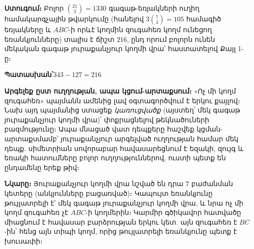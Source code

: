 \documentclass[11pt,a4paper]{article}
\newcommand{\answer}[1]{\begin{answerbox}\centering\textbf{Պատասխան՝}\quad #1\end{answerbox}}
\begin{document}
\textbf{Ստուգում։} Բոլոր $\binom{21}{3}=1330$ գագաթ-եռյակների ուղիղ համակարգչային թվարկումը
(հանելով $3\binom{7}{3}=105$ համագիծ եռյակները և $ABC$-ի որևէ կողմին զուգահեռ կողմ ունեցող
եռանկյունները) տալիս է ճիշտ $216$, ընդ որում բոլորն ունեն մեկական գագաթ յուրաքանչյուր կողմի վրա՝
հաստատելով Քայլ 1-ը։ \checkmark

\answer{$343-127=216$}

\begin{methodbox}
\textbf{Արգելեք ըստ ուղղության, ապա կցում-արտաքսում։} «Ոչ մի կողմ զուգահեռ»
պայմանն ամենից լավ օգտագործվում է երկու քայլով։ Նախ այդ պայմանից ստացեք \emph{կառուցվածք}
(այստեղ՝ մեկ գագաթ յուրաքանչյուր կողմի վրա)՝ փոքրացնելով թեկնածուների բազմությունը։ Ապա մնացած վատ
դեպքերը հաշվեք կցման-արտաքսմամբ՝ յուրաքանչյուր արգելված ուղղության համար մեկ դեպք. սիմետրիան սովորաբար
հավասարեցնում է եզակի, զույգ և եռակի հատումները բոլոր ուղղություններով, ուստի պետք են ընդամենը երեք
թիվ։
\end{methodbox}

\medskip
\textbf{Նկարը։} Յուրաքանչյուր կողմի վրա նշված են դրա $7$ բաժանման կետերը (անկյունները բացառված)։ Կապույտ
եռանկյունը թույլատրելի է՝ մեկ գագաթ յուրաքանչյուր կողմի վրա, և նրա ոչ մի կողմ զուգահեռ չէ $ABC$-ի կողմերին։ Կարմիր
գծիկավոր հատվածը միացնում է հավասար բարձրության երկու կետ. այն զուգահեռ է $BC$-ին՝ հենց այն տիպի
կողմ, որից թույլատրելի եռանկյունը պետք է խուսափի։

\begin{center}
\end{center}
\end{document}

